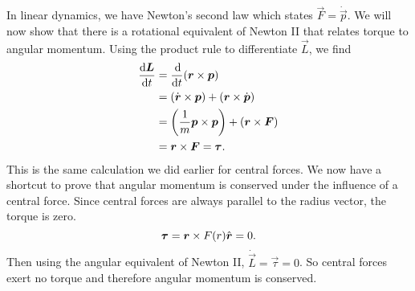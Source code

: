 \documentclass[../classical_mechanics.tex]{subfiles}
\begin{document}
            In linear dynamics, we have Newton's second law which states $\vec{F}=\dot{\vec{p}}$.
            We will now show that there is a rotational equivalent of Newton II that relates torque to angular momentum.
            Using the product rule to differentiate $\vec{L}$, we find
            \begin{align}
                \dv{\vec{L}}{t}&=\dv{}{t}(\vec{r}\times\vec{p})\\
                &=(\dot{\vec{r}}\times\vec{p})+(\vec{r}\times\dot{\vec{p}})\\
                &=\left(\frac{1}{m}\vec{p}\times\vec{p}\right)+(\vec{r}\times\vec{F})\\
                &=\vec{r}\times\vec{F}=\vec{\tau}.
            \end{align}
            This is the same calculation we did earlier for central forces.
            We now have a shortcut to prove that angular momentum is conserved under the influence of a central force.
            Since central forces are always parallel to the radius vector, the torque is zero.
            \begin{equation}
                \boldsymbol{\tau}=\boldsymbol{r}\times F(r)\hat{\boldsymbol{r}}=0.
            \end{equation}
            Then using the angular equivalent of Newton II, $\dot{\vec{L}}=\vec{\tau}=0$.
            So central forces exert no torque and therefore angular momentum is conserved.
\end{document}
